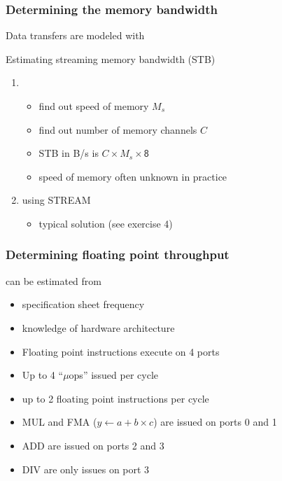 \documentclass[dvipsnames,presentation,aspectratio=169,14pt]{beamer}
\begin{document}
\begin{frame}
  \frametitle{Determining the memory bandwidth }
  Data transfers are modeled with 

  \begin{exampleblock}{Estimating streaming memory bandwidth (STB)}
    \begin{enumerate}[itemsep=5pt]
    \item {}
      \begin{itemize}[itemsep=3pt]
      \item find out speed of memory $M_{s}$
      \item find out number of memory channels $C$
      \item STB in B/s is $C \times M_{s} \times \mathsf 8$
      \item[\textcolor{Red}{\blacktriangleright}] speed of memory often unknown
        in practice
      \end{itemize}
    \item {} using STREAM
      \begin{itemize}
      \item typical solution (see exercise 4)
      \end{itemize}
    \end{enumerate}
  \end{exampleblock}
\end{frame}

\begin{frame}
  \frametitle{Determining floating point throughput}
   can be estimated from
  \begin{itemize}[4pt]
  \item specification sheet frequency
  \item knowledge of hardware architecture
  \end{itemize}

  \vskip 11pt

  \begin{itemize}[4pt]
  \item Floating point instructions execute on 4 ports
  \item Up to 4 ``$\mu$ops'' issued per cycle
  \item up to 2 floating point instructions per cycle
  \item MUL and FMA ($y \gets a + b\times c$) are issued on ports 0 and 1
  \item ADD are issued on ports 2 and 3
  \item DIV are only issues on port 3
  \end{itemize}
\end{frame}
\end{document}
